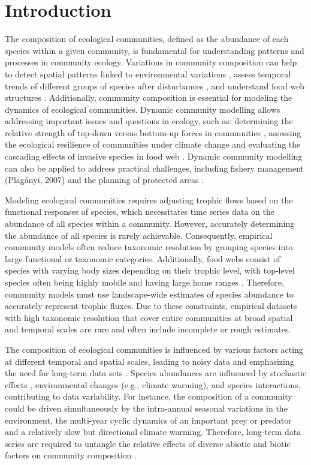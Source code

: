 \documentclass[a4paper,twoside,10pt]{article}
\begin{document}
\section*{Introduction}
The composition of ecological communities, defined as the abundance of each species within a given community, is fundamental for understanding patterns and processes in community ecology. Variations in community composition can help to detect spatial patterns linked to environmental variations \citep{kemp1990}, assess temporal trends of different groups of species after disturbances \citep{philippi1998, magurran2007}, and understand food web structures \citep{cohen2003}. Additionally, community composition is essential for modeling the dynamics of ecological communities. Dynamic community modelling allows addressing important issues and questions in ecology, such as: determining the relative strength of top-down versus bottom-up forces in communities \citep{krebs2003,legagneux2014}, assessing the ecological resilience of communities under climate change \citep{griffith2019} and evaluating the cascading effects of invasive species in food web \citep{david2017, goto2020}. Dynamic community modelling can also be applied to address practical challenges, including fishery management (Plagányi, 2007) and the planning of protected areas \citep{okey2004, dahood2020}. 

Modeling ecological communities requires adjusting trophic flows based on the functional responses of species, which necessitates time series data on the abundance of all species within a community. However, accurately determining the abundance of all species is rarely achievable. Consequently, empirical community models often reduce taxonomic resolution by grouping species into large functional or taxonomic categories. Additionally, food webs consist of species with varying body sizes depending on their trophic level, with top-level species often being highly mobile and having large home ranges \citep{mccann2005}. Therefore, community models must use landscape-wide estimates of species abundance to accurately represent trophic fluxes. Due to these constraints, empirical datasets with high taxonomic resolution that cover entire communities at broad spatial and temporal scales are rare and often include incomplete or rough estimates.

The composition of ecological communities is influenced by various factors acting at different temporal and spatial scales, leading to noisy data and emphasizing the need for long-term data sets \citep{magurran2010, lindenmayer2012}. Species abundances are influenced by stochastic effects \citep{hubbell2001}, environmental changes (e.g., climate warming), and species interactions, contributing to data variability. For instance, the composition of a community could be driven simultaneously by the intra-annual seasonal variations in the environment, the multi-year cyclic dynamics of an important prey or predator and a relatively slow but directional climate warming. Therefore, long-term data series are required to untangle the relative effects of diverse abiotic and biotic factors on community composition \citep{magurran2010, lindenmayer2012}.
\end{document}

